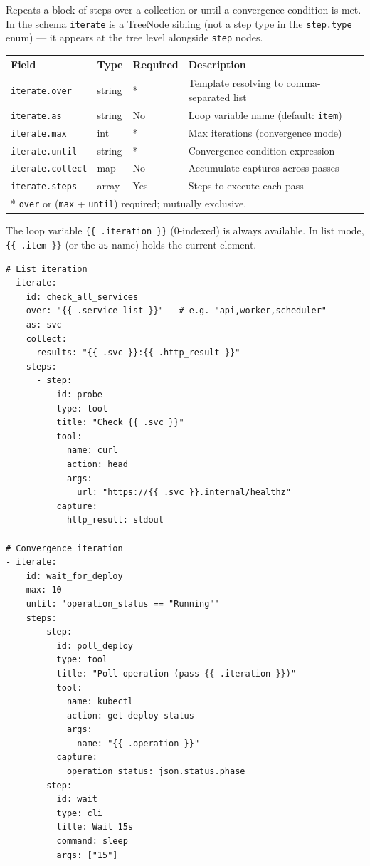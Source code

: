 Repeats a block of steps over a collection or until a convergence condition
is met.  In the schema \texttt{iterate} is a TreeNode sibling (not a step type in the
\texttt{step.type} enum) — it appears at the tree level alongside \texttt{step}
nodes.

\begin{center}
\begin{tabular}{lllp{5cm}}
\hline
\textbf{Field} & \textbf{Type} & \textbf{Required} & \textbf{Description} \\
\hline
\texttt{iterate.over}  & string & * & Template resolving to comma-separated list \\
\texttt{iterate.as}    & string & No & Loop variable name (default: \texttt{item}) \\
\texttt{iterate.max}   & int    & * & Max iterations (convergence mode) \\
\texttt{iterate.until} & string & * & Convergence condition expression \\
\texttt{iterate.collect} & map  & No & Accumulate captures across passes \\
\texttt{iterate.steps} & array  & Yes & Steps to execute each pass \\
\hline
\multicolumn{4}{l}{* \texttt{over} or (\texttt{max} + \texttt{until}) required; mutually exclusive.} \\
\end{tabular}
\end{center}

The loop variable \texttt{\{\{\ .iteration\ \}\}} (0-indexed) is always available.
In list mode, \texttt{\{\{\ .item\ \}\}} (or the \texttt{as} name) holds the
current element.

\begin{verbatim}
# List iteration
- iterate:
    id: check_all_services
    over: "{{ .service_list }}"   # e.g. "api,worker,scheduler"
    as: svc
    collect:
      results: "{{ .svc }}:{{ .http_result }}"
    steps:
      - step:
          id: probe
          type: tool
          title: "Check {{ .svc }}"
          tool:
            name: curl
            action: head
            args:
              url: "https://{{ .svc }}.internal/healthz"
          capture:
            http_result: stdout

# Convergence iteration
- iterate:
    id: wait_for_deploy
    max: 10
    until: 'operation_status == "Running"'
    steps:
      - step:
          id: poll_deploy
          type: tool
          title: "Poll operation (pass {{ .iteration }})"
          tool:
            name: kubectl
            action: get-deploy-status
            args:
              name: "{{ .operation }}"
          capture:
            operation_status: json.status.phase
      - step:
          id: wait
          type: cli
          title: Wait 15s
          command: sleep
          args: ["15"]
\end{verbatim}

